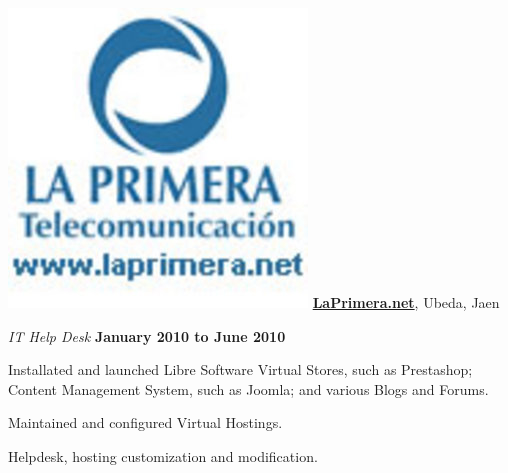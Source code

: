 \includegraphics[scale=0.1]{companies/laprimera.jpg} \href{http://www.laprimera.net/}{\textbf{LaPrimera.net}},
Ubeda, Jaen
\begin{outerlist}

\item[] \textit{IT Help Desk}%
        \hfill \textbf{January 2010 to June 2010}
\begin{innerlist}
\item Installated and launched Libre Software Virtual Stores, such as Prestashop; Content Management System, such as Joomla; and various Blogs and Forums.
\item Maintained and configured Virtual Hostings.
\item Helpdesk, hosting customization and modification.
\end{innerlist}

\end{outerlist}

%
%
%
